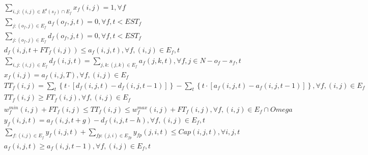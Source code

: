 \begin{align}
  & \underset{i , j : \left(i , j\right) \in E^{\text{s}} \left(s_{f}\right) \cap E_{f}}{\sum} x_{f} \left(i , j\right) = 1 , \forall f \tag{eq\_0023} \\
  & \sum_{j : \left(o_{f} , j\right) \in E_{f}} a_{f} \left(o_{f} , j , t\right) = 0 , \forall f , t < \mathit{EST}_{f} \tag{eq\_0024} \\
  & \sum_{j : \left(o_{f} , j\right) \in E_{f}} d_{f} \left(o_{f} , j , t\right) = 0 , \forall f , t < \mathit{EST}_{f} \tag{eq\_0025} \\
  & d_{f} \left(i , j , t + \mathit{FT}_{f} \left(i , j\right)\right) \leq a_{f} \left(i , j , t\right) , \forall f , \left(i , j\right) \in E_{f} , t \tag{eq\_0026} \\
  & \sum_{i , j : \left(i , j\right) \in E_{f}} d_{f} \left(i , j , t\right) = \sum_{j , k : \left(j , k\right) \in E_{f}} a_{f} \left(j , k , t\right) , \forall f , j \in N - o_{f} - s_{f} , t \tag{eq\_0027} \\
  & x_{f} \left(i , j\right) = a_{f} \left(i , j , T\right) , \forall f , \left(i , j\right) \in E_{f} \tag{eq\_0028} \\
  & \mathit{TT}_{f} \left(i , j\right) = \sum_{t} \left\{t \cdot \left[d_{f} \left(i , j , t\right) - d_{f} \left(i , j , t - 1\right)\right]\right\} - \sum_{t} \left\{t \cdot \left[a_{f} \left(i , j , t\right) - a_{f} \left(i , j , t - 1\right)\right]\right\} , \forall f , \left(i , j\right) \in E_{f} \tag{eq\_0029} \\
  & \mathit{TT}_{f} \left(i , j\right) \geq \mathit{FT}_{f} \left(i , j\right) , \forall f , \left(i , j\right) \in E_{f} \tag{eq\_0030} \\
  & w_{f}^{min} \left(i , j\right) + \mathit{FT}_{f} \left(i , j\right) \leq \mathit{TT}_{f} \left(i , j\right) \leq w_{f}^{max} \left(i , j\right) + \mathit{FT}_{f} \left(i , j\right) , \forall f , \left(i , j\right) \in E_{f} \cap \mathit{Omega} \tag{eq\_0031} \\
  & y_{f} \left(i , j , t\right) = a_{f} \left(i , j , t + g\right) - d_{f} \left(i , j , t - h\right) , \forall f , \left(i , j\right) \in E_{f} , t \tag{eq\_0032} \\
  & \sum_{f : \left(i , j\right) \in E_{f}} y_{f} \left(i , j , t\right) + \underset{fp : \left(j , i\right) \in E_{fp}}{\sum} y_{fp} \left(j , i , t\right) \leq \mathit{Cap} \left(i , j , t\right) , \forall i , j , t \tag{eq\_0033} \\
  & a_{f} \left(i , j , t\right) \geq a_{f} \left(i , j , t - 1\right) , \forall f , \left(i , j\right) \in E_{f} , t \tag{eq\_0034} \\

\end{align}
